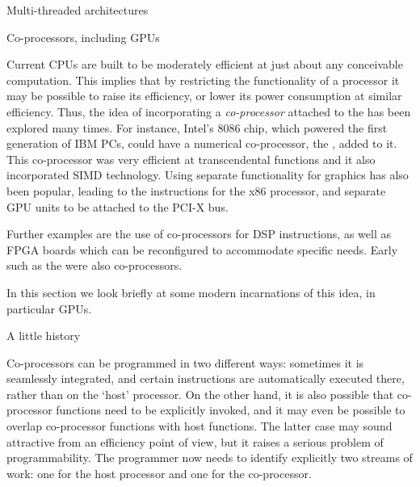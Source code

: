 
 {Multi-threaded architectures}
\label{sec:mta}


 {Co-processors, including GPUs}
\label{sec:copprocessor}

Current CPUs are built to be moderately efficient at just about any
conceivable computation. This implies that by restricting the
functionality of a processor it may be possible to raise its
efficiency, or lower its power consumption at similar
efficiency. Thus, the idea of incorporating a \emph{co-processor}
attached to the 
has been explored many times. For instance, Intel's 8086 chip, which
powered the first generation of IBM PCs, could have a numerical
co-processor, the , added to it.
This co-processor was very
efficient at transcendental functions and it also incorporated
\ac{SIMD} technology. Using separate functionality for graphics has also
been popular, leading to the  instructions for the x86 processor,
and separate \ac{GPU} units to be attached to the PCI-X bus.

Further examples are the use of co-processors
  for \ac{DSP} instructions, as well as \ac{FPGA} boards which can be
  reconfigured to accommodate specific needs.
Early 
such as the  were also co-processors.

In this section we look briefly at some modern incarnations of this idea,
in particular \acp{GPU}.

 {A little history}

Co-processors can be programmed in two different ways: sometimes 
it is seamlessly integrated, and certain instructions are
automatically executed there, rather than on the `host' processor. On
the other hand, it is also possible that co-processor functions need
to be explicitly invoked, and it may even be possible to overlap
co-processor functions with host functions. The latter case may sound
attractive from an efficiency point of view, but it raises a serious
problem of programmability. The programmer now needs to identify
explicitly two streams of work: one for the host processor and one for
the co-processor.

